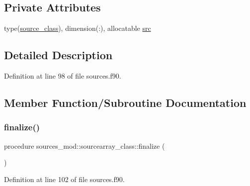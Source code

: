 \subsection*{Private Attributes}
\begin{DoxyCompactItemize}
\item 
type(\mbox{\hyperlink{structsources__mod_1_1source__class}{source\+\_\+class}}), dimension(\+:), allocatable \mbox{\hyperlink{structsources__mod_1_1sourcearray__class_ac5330284d9b377fda2051add379945b3}{src}}
\end{DoxyCompactItemize}


\subsection{Detailed Description}


Definition at line 98 of file sources.\+f90.



\subsection{Member Function/\+Subroutine Documentation}
\mbox{\label{structsources__mod_1_1sourcearray__class_a340d2ef95d4040b358f872c3a74c9bf4}} 
\subsubsection{\texorpdfstring{finalize()}{finalize()}}
{\footnotesize\ttfamily procedure sources\+\_\+mod\+::sourcearray\+\_\+class\+::finalize (\begin{DoxyParamCaption}{ }\end{DoxyParamCaption})\hspace{0.3cm}{\ttfamily [private]}}



Definition at line 102 of file sources.\+f90.

\mbox{\label{structsources__mod_1_1sourcearray__class_a12178d9809ca8ccdf0de690fcc018050}} 
